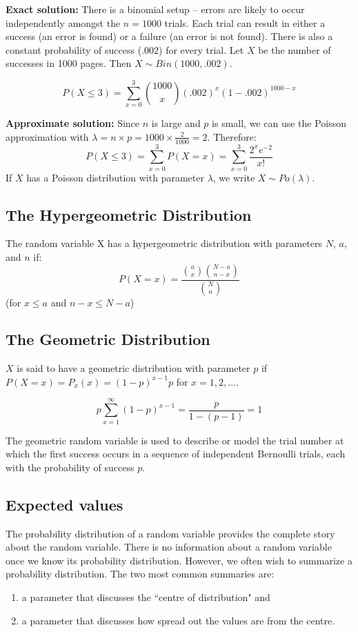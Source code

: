 \documentclass[12pt]{article}
\begin{document}
\textbf{Exact solution:} There is a binomial setup -- errors are likely to occur independently amongst the $n = 1000$ trials. Each trial can result in either a success (an error is found) or a failure (an error is not found). There is also a constant probability of success ($.002$) for every trial. Let $X$ be the number of successes in 1000 pages. Then $X \sim Bin(1000, .002)$.

\[
    P(X \leq 3) = \sum_{x = 0}^{3} {1000 \choose x} (.002)^x (1 - .002)^{1000-x}
\]

\textbf{Approximate solution:} Since $n$ is large and $p$ is small, we can use the Poisson approximation with $\lambda = n \times p = 1000 \times \frac{2}{1000} = 2$. Therefore:
\[
    P(X \leq 3) = \sum_{x = 0}^{3} P(X = x) = \sum_{x=0}^{3} \frac{2^x e^{-2}}{x!}
\]
If $X$ has a Poisson distribution with parameter $\lambda$, we write $X \sim Po(\lambda)$.

\subsection{The Hypergeometric Distribution}

The random variable X has a hypergeometric distribution with parameters $N$, $a$, and $n$ if:
\[
    P(X = x) = \frac{{a \choose x} \binom{N-a}{n-x}}{{N \choose n}}
\]
(for $x \leq a$ and $n-x \leq N-a$)

\subsection{The Geometric Distribution}

$X$ is said to have a geometric distribution with parameter $p$ if $P(X = x) = P_x (x) = (1-p)^{x-1} p$ for $x = 1, 2, \ldots$.

\[
    p \sum_{x = 1}^{\infty} (1-p)^{x-1} = \frac{p}{1-(p-1)} = 1
\]

The geometric random variable is used to describe or model the trial number at which the first success occurs in a sequence of independent Bernoulli trials, each with the probability of success $p$.

\subsection{Expected values}
The probability distribution of a random variable provides the complete story about the random variable. There is no information about a random variable once we know its probability distribution. However, we often wish to summarize a probability distribution. The two most common summaries are:
\begin{enumerate}
    \item a parameter that discusses the ``centre of distribution" and
    \item a parameter that discusses how spread out the values are from the centre.
\end{enumerate}
\end{document}
